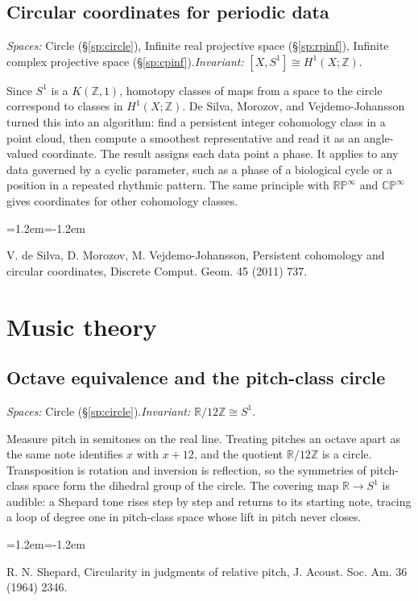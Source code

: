 \documentclass[11pt,twoside]{book}
\begin{document}
\subsection{Circular coordinates for periodic data}\label{app:app-circular}
\noindent\textit{Spaces:} Circle (\S\ref{sp:circle}), Infinite real projective space (\S\ref{sp:rpinf}), Infinite complex projective space (\S\ref{sp:cpinf}).\enspace\textit{Invariant:} $[X,S^1]\cong H^1(X;\mathbb{Z})$.

Since $S^1$ is a $K(\mathbb{Z},1)$, homotopy classes of maps from a space to the circle correspond to classes in $H^1(X;\mathbb{Z})$. De Silva, Morozov, and Vejdemo-Johansson turned this into an algorithm: find a persistent integer cohomology class in a point cloud, then compute a smoothest representative and read it as an angle-valued coordinate. The result assigns each data point a phase. It applies to any data governed by a cyclic parameter, such as a phase of a biological cycle or a position in a repeated rhythmic pattern. The same principle with $\mathbb{RP}^\infty$ and $\mathbb{CP}^\infty$ gives coordinates for other cohomology classes.
\begin{list}{}{\leftmargin=1.2em\itemindent=-1.2em\itemsep=0pt}\small \item V. de Silva, D. Morozov, M. Vejdemo-Johansson, Persistent cohomology and circular coordinates, Discrete Comput. Geom. 45 (2011) 737.\end{list}
\section{Music theory}
\subsection{Octave equivalence and the pitch-class circle}\label{app:app-pitchclass}
\noindent\textit{Spaces:} Circle (\S\ref{sp:circle}).\enspace\textit{Invariant:} $\mathbb{R}/12\mathbb{Z}\cong S^1$.

Measure pitch in semitones on the real line. Treating pitches an octave apart as the same note identifies $x$ with $x+12$, and the quotient $\mathbb{R}/12\mathbb{Z}$ is a circle. Transposition is rotation and inversion is reflection, so the symmetries of pitch-class space form the dihedral group of the circle. The covering map $\mathbb{R}\to S^1$ is audible: a Shepard tone rises step by step and returns to its starting note, tracing a loop of degree one in pitch-class space whose lift in pitch never closes.
\begin{list}{}{\leftmargin=1.2em\itemindent=-1.2em\itemsep=0pt}\small \item R. N. Shepard, Circularity in judgments of relative pitch, J. Acoust. Soc. Am. 36 (1964) 2346.\end{list}
\end{document}
